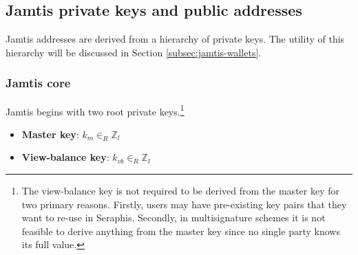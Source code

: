 \subsection{Jamtis private keys and public addresses}
\label{subsec:jamtis-private-keys-public-addresses}

Jamtis addresses are derived from a hierarchy of private keys. The utility of this hierarchy will be discussed in Section \ref{subsec:jamtis-wallets}.

\subsubsection{Jamtis core}
\label{subsubsec:jamtis-core}

Jamtis begins with two root private keys.\footnote{The view-balance key is not required to be derived from the master key for two primary reasons. Firstly, users may have pre-existing key pairs that they want to re-use in Seraphis. Secondly, in multisignature schemes it is not feasible to derive anything from the master key since no single party knows its full value.}
\begin{itemize}
    \item \textbf{Master key}: $k_m \in_R \mathbb{Z}_l$
    \item \textbf{View-balance key}: $k_{vb} \in_R \mathbb{Z}_l$
\end{itemize}

